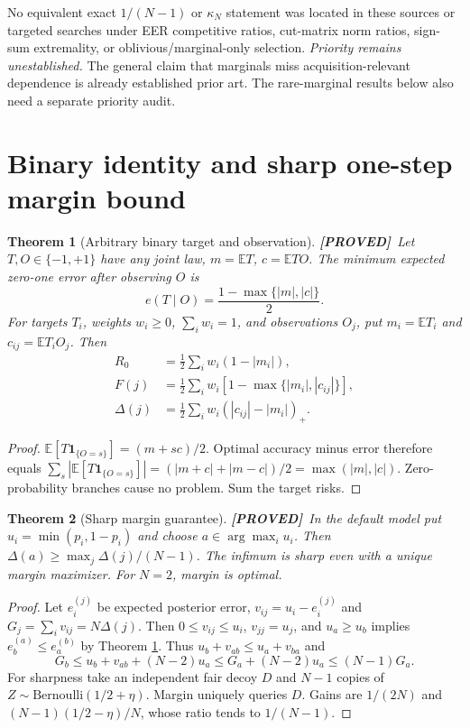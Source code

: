 \documentclass[11pt]{article}
\newtheorem{theorem}{Theorem}[section]
\theoremstyle{definition}
\newcommand{\E}{\mathbb E}
\newcommand{\1}{\mathbf 1}
\newcommand{\pos}[1]{\left(#1\right)_{+}}
\newcommand{\pr}{\textbf{[PROVED]}}
\begin{document}
\normalsize
No equivalent exact $1/(N-1)$ or $\kappa_N$ statement was located in these
sources or targeted searches under EER competitive ratios, cut-matrix norm
ratios, sign-sum extremality, or oblivious/marginal-only selection.
\emph{Priority remains unestablished.} The general claim that marginals miss
acquisition-relevant dependence is already established prior art.
The rare-marginal results below also need a separate priority audit.

\section{Binary identity and sharp one-step margin bound}
\begin{theorem}[Arbitrary binary target and observation]\label{th:binary}
\pr\ Let $T,O\in\{-1,+1\}$ have any joint law, $m=\E T$, $c=\E TO$.
The minimum expected zero-one error after observing $O$ is
\[
 e(T\mid O)=\frac{1-\max\{|m|,|c|\}}2.
\]
For targets $T_i$, weights $w_i\ge0$, $\sum_iw_i=1$, and observations $O_j$,
put $m_i=\E T_i$ and $c_{ij}=\E T_iO_j$. Then
\begin{align}
 R_0&=\tfrac12\sum_iw_i(1-|m_i|),\\
 F(j)&=\tfrac12\sum_iw_i[1-\max\{|m_i|,|c_{ij}|\}],\\
 \Delta(j)&=\tfrac12\sum_iw_i\pos{|c_{ij}|-|m_i|}.\label{eq:gain}
\end{align}
\end{theorem}
\begin{proof}
$\E[T\1_{\{O=s\}}]=(m+sc)/2$. Optimal accuracy minus error therefore equals
$\sum_s|\E[T\1_{\{O=s\}}]|=(|m+c|+|m-c|)/2=\max(|m|,|c|)$.
Zero-probability branches cause no problem. Sum the target risks.
\end{proof}
\begin{theorem}[Sharp margin guarantee]\label{th:margin}
\pr\ In the default model put $u_i=\min(p_i,1-p_i)$ and choose
$a\in\arg\max_i u_i$. Then
$\Delta(a)\ge\max_j\Delta(j)/(N-1)$.
The infimum is sharp even with a unique margin maximizer.
For $N=2$, margin is optimal.
\end{theorem}
\begin{proof}
Let $e_i^{(j)}$ be expected posterior error, $v_{ij}=u_i-e_i^{(j)}$ and
$G_j=\sum_i v_{ij}=N\Delta(j)$.
Then $0\le v_{ij}\le u_i$, $v_{jj}=u_j$, and $u_a\ge u_b$ implies
$e_b^{(a)}\le e_a^{(b)}$ by Theorem \ref{th:binary}.
Thus $u_b+v_{ab}\le u_a+v_{ba}$ and
\[
 G_b\le u_b+v_{ab}+(N-2)u_a
 \le G_a+(N-2)u_a\le(N-1)G_a.
\]
For sharpness take an independent fair decoy $D$ and $N-1$ copies of
$Z\sim\mathrm{Bernoulli}(1/2+\eta)$. Margin uniquely queries $D$.
Gains are $1/(2N)$ and $(N-1)(1/2-\eta)/N$, whose ratio tends to $1/(N-1)$.
\end{proof}
\end{document}
